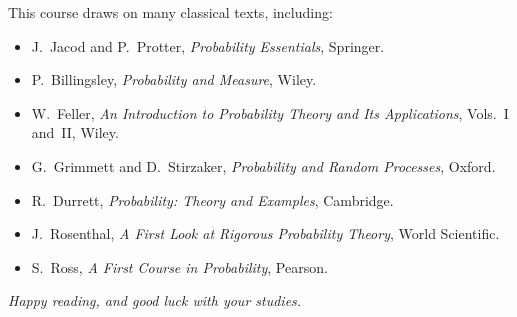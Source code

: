 This course draws on many classical texts, including:
\begin{itemize}
    \item J.~Jacod and P.~Protter, \textit{Probability Essentials}, Springer.
    \item P.~Billingsley, \textit{Probability and Measure}, Wiley.
    \item W.~Feller, \textit{An Introduction to Probability Theory and Its Applications},
          Vols.~I and~II, Wiley.
    \item G.~Grimmett and D.~Stirzaker, \textit{Probability and Random Processes}, Oxford.
    \item R.~Durrett, \textit{Probability: Theory and Examples}, Cambridge.
    \item J.~Rosenthal, \textit{A First Look at Rigorous Probability Theory}, World Scientific.
    \item S.~Ross, \textit{A First Course in Probability}, Pearson.
\end{itemize}

\bigskip

\hfill\textit{Happy reading, and good luck with your studies.}
